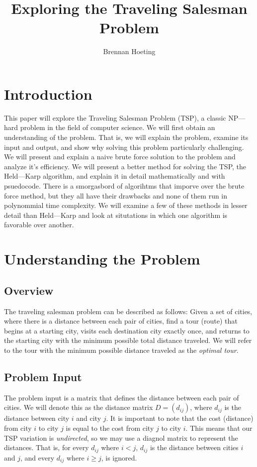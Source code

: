 \documentclass[11pt,fleqn]{article}
\begin{document}
\title{Exploring the Traveling Salesman Problem}
\author{Brennan Hoeting}
\date{}
\maketitle

\section*{Introduction}
This paper will explore the Traveling Salesman Problem (TSP),
a classic NP---hard problem in the field of computer science.
We will first obtain an understanding of the problem. That
is, we will explain the problem, examine its input and output,
and show why solving this problem particularly challenging.
We will present and explain a naive brute force solution to the
problem and analyze it's efficiency.  We will present a better
method for solving the TSP, the Held---Karp algorithm, and explain
it in detail mathematically and with psuedocode.  There is a 
smorgasbord of algorihtms that imporve over the brute force method,
but they all have their drawbacks and none of them run in polynommial
time complexity.  We will examine a few of these methods in lesser
detail than Held---Karp and look at situtations in which one algorithm
is favorable over another.

\section{Understanding the Problem}
\subsection{Overview}
The traveling salesman problem can be described as follows:
Given a set of cities, where there is a distance between
each pair of cities, find a tour (route) that begins at a
starting city, visits each destination city exactly once,
and returns to the starting city with the minimum possible
total distance traveled.  We will refer to the tour with the
minimum possible distance traveled as the \textit{optimal tour}.

\subsection{Problem Input}
The problem input is a matrix that defines the distance
between each pair of cities.  We will denote this as
the distance matrix $D = (d_{ij})$, where $d_{ij}$ is
the distance between city $i$ and city $j$.  It is important
to note that the cost (distance) from city $i$ to city $j$ is equal
to the cost from city $j$ to city $i$. This means that our
TSP variation is \textit{undirected}, so we may use a diagnol
matrix to represent the distances.  That is, for every $d_{ij}$
where $i<j$, $d_{ij}$ is the distance between cities $i$ and $j$,
and every $d_{ij}$ where $i\geq j$, is ignored.
\par
\end{document}
